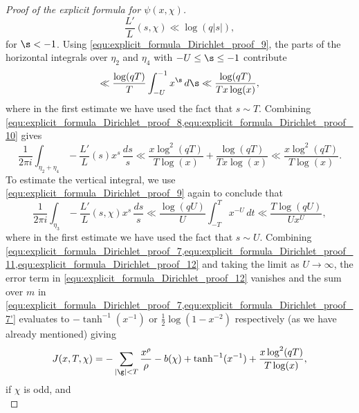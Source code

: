 \begin{proof}[Proof of the explicit formula for $\psi(x,\chi)$]
        \begin{equation}\label{equ:explicit_formula_Dirichlet_proof_9}
          \frac{L'}{L}(s,\chi) \ll \log(q|s|),
        \end{equation}
        for $\s < -1$. Using \cref{equ:explicit_formula_Dirichlet_proof_9}, the parts of the horizontal integrals over $\eta_{2}$ and $\eta_{4}$ with $-U \le \s \le -1$ contribute
        \begin{equation}\label{equ:explicit_formula_Dirichlet_proof_10}
          \ll \frac{\log(qT)}{T}\int_{-U}^{-1}x^{\s}\,d\s \ll \frac{\log(qT)}{Tx\log(x)},
        \end{equation}
        where in the first estimate we have used the fact that $s \sim T$. Combining \cref{equ:explicit_formula_Dirichlet_proof_8,equ:explicit_formula_Dirichlet_proof_10} gives
        \begin{equation}\label{equ:explicit_formula_Dirichlet_proof_11}
          \frac{1}{2\pi i}\int_{\eta_{2}+\eta_{4}}-\frac{L'}{L}(s)x^{s}\,\frac{ds}{s} \ll \frac{x\log^{2}(qT)}{T\log(x)}+\frac{\log(qT)}{Tx\log(x)} \ll \frac{x\log^{2}(qT)}{T\log(x)}.
        \end{equation}
        To estimate the vertical integral, we use \cref{equ:explicit_formula_Dirichlet_proof_9} again to conclude that
        \begin{equation}\label{equ:explicit_formula_Dirichlet_proof_12}
          \frac{1}{2\pi i}\int_{\eta_{3}}-\frac{L'}{L}(s,\chi)x^{s}\,\frac{ds}{s} \ll \frac{\log(qU)}{U}\int_{-T}^{T}x^{-U}\,dt \ll \frac{T\log(qU)}{Ux^{U}},
        \end{equation}
        where in the first estimate we have used the fact that $s \sim U$. Combining \cref{equ:explicit_formula_Dirichlet_proof_7,equ:explicit_formula_Dirichlet_proof_11,equ:explicit_formula_Dirichlet_proof_12} and taking the limit as $U \to \infty$, the error term in \cref{equ:explicit_formula_Dirichlet_proof_12} vanishes and the sum over $m$ in \cref{equ:explicit_formula_Dirichlet_proof_7,equ:explicit_formula_Dirichlet_proof_7'} evaluates to $-\tanh^{-1}(x^{-1})$ or $\frac{1}{2}\log(1-x^{-2})$ respectively (as we have already mentioned) giving
        \begin{equation}\label{equ:explicit_formula_Dirichlet_proof_13}
          J(x,T,\chi) = -\sum_{|\g| < T}\frac{x^{\rho}}{\rho}-b(\chi)+\tanh^{-1}(x^{-1})+\frac{x\log^{2}(qT)}{T\log(x)},
        \end{equation}
        if $\chi$ is odd, and
        \begin{equation}\label{equ:explicit_formula_Dirichlet_proof_13'}

\end{equation}
\end{proof}
